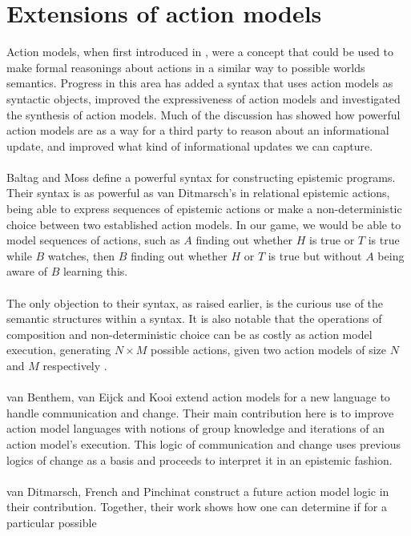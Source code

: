 \section{Extensions of action models}
Action models, when first introduced in \cite{baltag1998lpa}, were a concept that could be used to make
formal reasonings about actions in a similar way to possible worlds semantics.
Progress in this area has added a syntax that uses action models as syntactic
objects, improved the expressiveness of action models and investigated the
synthesis of action models.
Much of the discussion has showed how powerful action models are as a way for a
third party to reason about an informational update, and improved what kind of
informational updates we can capture.\\
\\
Baltag and Moss \cite{baltag2005programs} define a powerful syntax for constructing epistemic programs.
Their syntax is as powerful as van Ditmarsch's in relational epistemic actions,
being able to express sequences of epistemic actions or make a non-deterministic
choice between two established action models.
In our game, we would be able to model sequences of actions, such as $A$ finding
out whether $H$ is true or $T$ is true while $B$ watches, then $B$ finding out
whether $H$ or $T$ is true but without $A$ being aware of $B$ learning this.\\
\\
The only objection to their syntax, as raised earlier, is the curious use of
the semantic structures within a syntax.
It is also notable that the operations of composition and non-deterministic
choice can be as costly as action model execution, generating $N \times M$
possible actions, given two action models of size $N$ and $M$
respectively \cite{baltag2005programs}.\\
\\
van Benthem, van Eijck and Kooi \cite{benthem2006lcc} extend action models for a new language to
handle communication and change.
Their main contribution here is to improve action model languages with notions
of group knowledge and iterations of an action model's execution.
This logic of communication and change uses previous logics of change as a basis
and proceeds to interpret it in an epistemic fashion.\\
\\
van Ditmarsch, French and Pinchinat \cite{van2009simulation,van2010future} construct a future action model logic in
their contribution.
Together, their work shows how one can determine if for a particular possible
